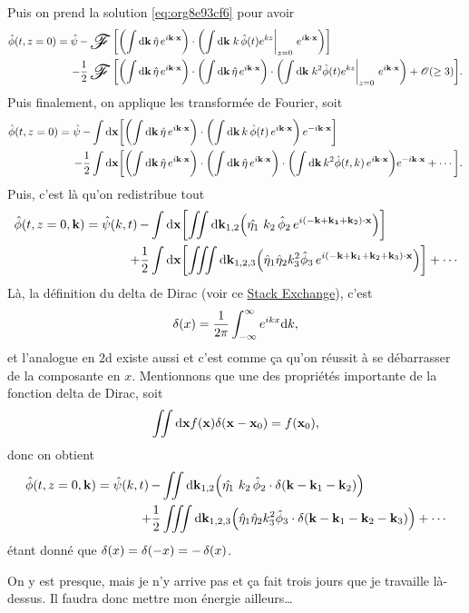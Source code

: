 \documentclass[10pt]{article}
\numberwithin{equation}{section}
\newcommand{\xx}{\vb{x}}
\newcommand{\fourier}{\operatorname{\raisebox{-0.4em}{\resizebox{2em}{!}{$\mathscr{F}$}}}}
\begin{document}
Puis on prend la solution \ref{eq:org8e93cf6} pour avoir
\begin{align}
   \hat{\phi}(t,z=0) = \hat{\psi}\, -& \fourier\bigg[\qty(\int \dd\vb{k}\, \hat{\eta}\, e^{i\vb{k}\cdot\xx}) \cdot\qty(\int\dd\vb{k}\eval{k\,\hat{\phi}(t)e^{kz}}_{z=0}\,e^{i\vb{k}\cdot\xx})\bigg]\nonumber\\
   -\frac{1}{2}&\fourier \bigg[\qty(\int \dd\vb{k}\, \hat{\eta}\, e^{i\vb{k}\cdot\xx})\cdot\qty(\int \dd\vb{k}\, \hat{\eta}\, e^{i\vb{k}\cdot\xx})\cdot \qty(\int\dd\vb{k}\eval{k^2 \hat{\phi}(t)e^{kz}}_{z=0}\,e^{i\vb{k}\cdot\xx})
   +\mathscr{O}(\geq3)\bigg].
\end{align}
Puis finalement, on applique les transformée de Fourier, soit
\begin{align}
   \hat{\phi}(t,z=0) = \hat{\psi}\, -& \int\dd\xx\bigg[\qty(\int \dd\vb{k}\, \hat{\eta}\, e^{i\vb{k}\cdot\xx}) \cdot\qty(\int\dd\vb{k}\, k\,\hat{\phi}(t)\,e^{i\vb{k}\cdot\xx})\,e^{-i\vb{k}\cdot\xx}\bigg]\nonumber\\
   -\frac{1}{2}&\int\dd\xx \bigg[\qty(\int \dd\vb{k}\, \hat{\eta}\, e^{i\vb{k}\cdot\xx})\cdot\qty(\int \dd\vb{k}\, \hat{\eta}\, e^{i\vb{k}\cdot\xx})\cdot \qty(\int\dd\vb{k}\,k^2 \hat{\phi}(t,k)\,e^{i\vb{k}\cdot\xx})e^{-i\vb{k}\cdot\xx}
   +\cdots\bigg].
\end{align}
Puis, c'est là qu'on redistribue tout
\begin{align}
   \hat{\phi}(t,z=0,\vb{k}) = \hat{\psi}(k,t)\, -& \int\dd\xx\qty[\iint\dd\vb{k}_{1,2}\qty( \hat{\eta_1}\, \,k_2\,\hat{\phi}_2\,e^{i(-\vb{k} + \vb{k_1}+\vb{k}_2)\cdot\xx})]\nonumber\\
   +\frac{1}{2}&\int\dd\xx \qty[\iiint \dd\vb{k}_{1,2,3}\qty( \hat{\eta}_1\hat{\eta}_2  k_3^2 \hat{\phi}_3\,e^{i(-\vb{k} + \vb{k}_1+\vb{k}_2+\vb{k}_3)\cdot\xx}) ]    + \cdots
\end{align}
Là, la définition du delta de Dirac (voir ce \href{https://math.stackexchange.com/questions/1343859/why-does-integrating-a-complex-exponential-give-the-delta-function}{Stack Exchange}), c'est
\begin{equation}
   \var(x) = \frac{1}{2\pi} \int_{-\infty}^\infty e^{ikx} \dd k,
\end{equation}
et l'analogue en 2d existe aussi et c'est comme ça qu'on réussit à se débarrasser de la composante en \(x\).
Mentionnons que une des propriétés importante de la fonction delta de Dirac, soit
\begin{equation}
   \iint \dd\xx f(\xx) \delta(\xx - \xx_0) = f(\xx_0),
\end{equation}
donc on obtient
\begin{align}
   \hat{\phi}(t,z=0,\vb{k}) = \hat{\psi}(k,t)\, -& \iint\dd\vb{k}_{1,2}\qty( \hat{\eta_1}\, \,k_2\,\hat{\phi}_2\cdot \var(\vb{k}-\vb{k}_1-\vb{k}_2))\nonumber\\
   +\frac{1}{2}&\iiint \dd\vb{k}_{1,2,3}\qty( \hat{\eta}_1\hat{\eta}_2  k_3^2 \hat{\phi}_3 \cdot\var(\vb{k} - \vb{k}_1 - \vb{k}_2 - \vb{k}_3))    + \cdots
\end{align}
étant donné que \(\var(x) = \var(-x) = -\var(x)\).\bigskip

On y est presque, mais je n'y arrive pas et ça fait trois jours que je travaille là-dessus.
Il faudra donc mettre mon énergie ailleurs\ldots{}

\printbibliography
\end{document}
